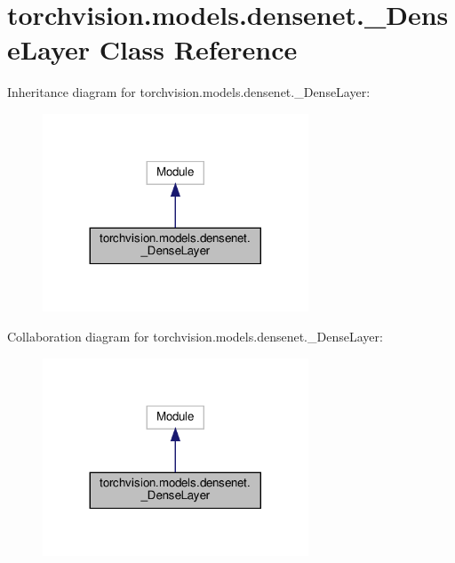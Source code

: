 \hypertarget{classtorchvision_1_1models_1_1densenet_1_1__DenseLayer}{}\section{torchvision.\+models.\+densenet.\+\_\+\+Dense\+Layer Class Reference}
\label{classtorchvision_1_1models_1_1densenet_1_1__DenseLayer}


Inheritance diagram for torchvision.\+models.\+densenet.\+\_\+\+Dense\+Layer\+:
\nopagebreak
\begin{figure}[H]
\begin{center}
\leavevmode
\includegraphics[width=224pt]{classtorchvision_1_1models_1_1densenet_1_1__DenseLayer__inherit__graph}
\end{center}
\end{figure}


Collaboration diagram for torchvision.\+models.\+densenet.\+\_\+\+Dense\+Layer\+:
\nopagebreak
\begin{figure}[H]
\begin{center}
\leavevmode
\includegraphics[width=224pt]{classtorchvision_1_1models_1_1densenet_1_1__DenseLayer__coll__graph}
\end{center}
\end{figure}
